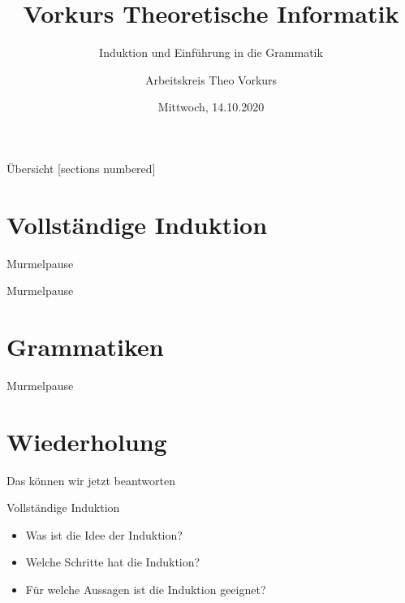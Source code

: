

\title{Vorkurs Theoretische Informatik}
\subtitle{Induktion und Einführung in die Grammatik}
\date{Mittwoch, 14.10.2020}
\author{Arbeitskreis Theo Vorkurs}



\maketitle

\begin{frame}[fragile]{Übersicht}
  [sections numbered]
  \tableofcontents%
\end{frame}

\section{Vollständige Induktion}



\begin{frame}[standout]
  Murmelpause
\end{frame}





\begin{frame}[standout]
  Murmelpause
\end{frame}

\section{Grammatiken}



\begin{frame}[standout]
  Murmelpause
\end{frame}



\section{Wiederholung}
\begin{frame}[fragile]{Das können wir jetzt beantworten}
	\begin{alertblock}{Vollständige Induktion}
		\begin{itemize}
			\item Was ist die Idee der Induktion?
			\item Welche Schritte hat die Induktion? %
			\item Für welche Aussagen ist die Induktion geeignet?
		\end{itemize}
	\end{alertblock}
\end{frame}

